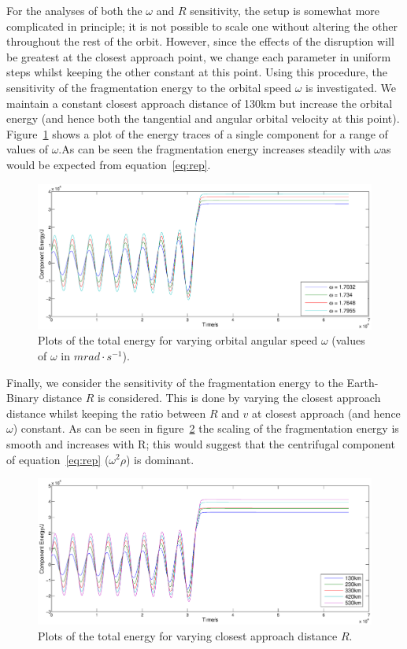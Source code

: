 \documentclass[letterpaper, preprint, paper,11pt]{AAS}	%
\begin{document}
For the analyses of both the $\omega$ and $R$ sensitivity, the setup is somewhat more complicated in principle; it is not possible to scale one without altering the other throughout the rest of the orbit. However, since the effects of the disruption will be greatest at the closest approach point, we change each parameter in uniform steps whilst keeping the other constant at this point. 
Using this procedure, the sensitivity of the fragmentation energy to the orbital speed $\omega$ is investigated. We maintain a constant closest approach distance of 130km but increase the orbital energy (and hence both the tangential and angular orbital velocity at this point). Figure~\ref{fig:omegasens} shows a plot of the energy traces of a single component for a range of values of $\omega$.As can be seen the fragmentation energy increases steadily with $\omega$as would be expected from equation~\ref{eq:rep}. 
\begin{figure}[H]
\centering
\centerline{\includegraphics[width=1.2\textwidth]{omegasens.eps}} 
\caption{Plots of the total energy for varying orbital angular speed $\omega$ (values of $\omega$ in $mrad\cdot s^{-1}$).} 
\label{fig:omegasens}
\end{figure} 


Finally, we consider the sensitivity of the fragmentation energy to the Earth-Binary distance $R$ is considered. This is done by varying the closest approach distance whilst keeping the ratio between $R$ and $v$ at closest approach (and hence $\omega$) constant. As can be seen in figure~\ref{fig:Rsens} the scaling of the fragmentation energy is smooth and increases with R; this would suggest that the centrifugal component of equation~\ref{eq:rep} ($\omega^2\rho$) is dominant.
\begin{figure}[H]
\centering
\centerline{\includegraphics[width=1.2\textwidth]{Rsens.eps}} 
\caption{Plots of the total energy for varying closest approach distance $R$.} 
\label{fig:Rsens}
\end{figure} 
\end{document}
